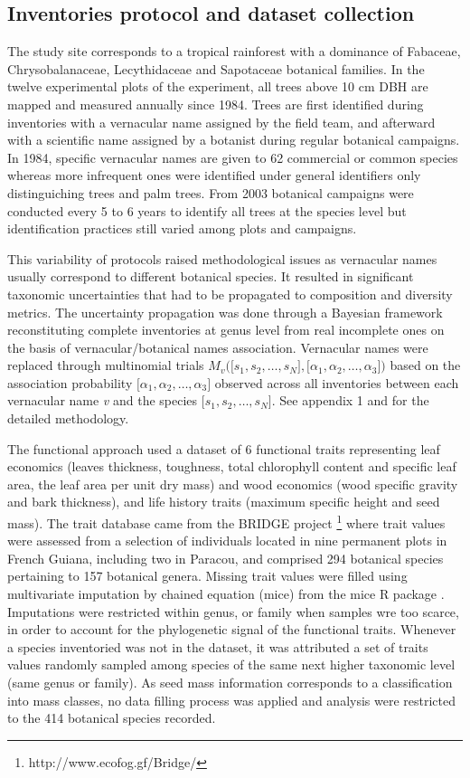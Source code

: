 \documentclass[fleqn,10pt]{ArtEcoFoG} %
\theoremstyle{definition}
\theoremstyle{definition}
\theoremstyle{definition}
\theoremstyle{remark}
\begin{document}
\subsection{Inventories protocol and dataset
collection}\label{protocols}

The study site corresponds to a tropical rainforest with a dominance of
Fabaceae, Chrysobalanaceae, Lecythidaceae and Sapotaceae botanical
families. In the twelve experimental plots of the experiment, all trees
above 10 cm DBH are mapped and measured annually since 1984. Trees are
first identified during inventories with a vernacular name assigned by
the field team, and afterward with a scientific name assigned by a
botanist during regular botanical campaigns. In 1984, specific
vernacular names are given to 62 commercial or common species whereas
more infrequent ones were identified under general identifiers only
distinguiching trees and palm trees. From 2003 botanical campaigns were
conducted every 5 to 6 years to identify all trees at the species level
but identification practices still varied among plots and campaigns.

This variability of protocols raised methodological issues as vernacular
names usually correspond to different botanical species. It resulted in
significant taxonomic uncertainties that had to be propagated to
composition and diversity metrics. The uncertainty propagation was done
through a Bayesian framework reconstituting complete inventories at
genus level from real incomplete ones on the basis of
vernacular/botanical names association. Vernacular names were replaced
through multinomial trials
\(M_v\Big(\big[s_1, s_2, …, s_N\big],\big[\alpha_1, \alpha_2,…, \alpha_3\big]\Big)\)
based on the association probability
\(\big[\alpha_1, \alpha_2,…, \alpha_3\big]\) observed across all
inventories between each vernacular name \emph{v} and the species
\(\big[s_1, s_2, …, s_N\big]\). See appendix 1 and
\citet{Aubry-Kientz2013} for the detailed methodology.

The functional approach used a dataset of 6 functional traits
representing leaf economics (leaves thickness, toughness, total
chlorophyll content and specific leaf area, the leaf area per unit dry
mass) and wood economics (wood specific gravity and bark thickness), and
life history traits (maximum specific height and seed mass). The trait
database came from the BRIDGE project \footnote{http://www.ecofog.gf/Bridge/}
where trait values were assessed from a selection of individuals located
in nine permanent plots in French Guiana, including two in Paracou, and
comprised 294 botanical species pertaining to 157 botanical genera.
Missing trait values were filled using multivariate imputation by
chained equation (mice) from the mice R package \citep{Mice2011}.
Imputations were restricted within genus, or family when samples wre too
scarce, in order to account for the phylogenetic signal of the
functional traits. Whenever a species inventoried was not in the
dataset, it was attributed a set of traits values randomly sampled among
species of the same next higher taxonomic level (same genus or family).
As seed mass information corresponds to a classification into mass
classes, no data filling process was applied and analysis were
restricted to the 414 botanical species recorded.
\end{document}
